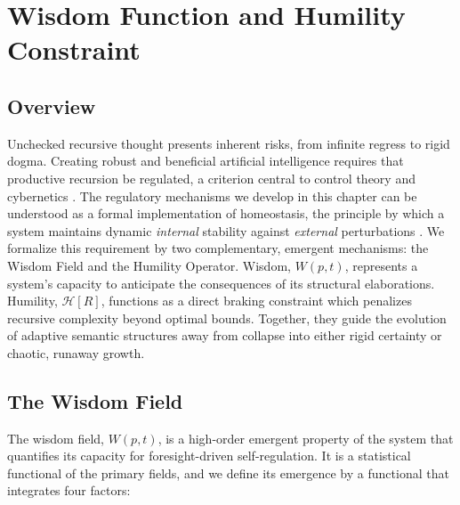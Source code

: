 \chapter{Wisdom Function and Humility Constraint}
\label{8:wisdom_function_and_humility_constraint}


\section{Overview}
\label{8.1:overview}

Unchecked recursive thought presents inherent risks, from infinite regress to rigid dogma. Creating robust and beneficial artificial intelligence requires that productive recursion be regulated, a criterion central to control theory and cybernetics \autocite{Kalman1960, AndersonMoore1990, Wiener1948, Ashby1952, RussellDeweyTegmark2016}. The regulatory mechanisms we develop in this chapter can be understood as a formal implementation of homeostasis, the principle by which a system maintains dynamic \textit{internal} stability against \textit{external} perturbations \autocite{Cannon1932}. We formalize this requirement by two complementary, emergent mechanisms: the Wisdom Field and the Humility Operator. Wisdom, \(W(p,t)\), represents a system's capacity to anticipate the consequences of its structural elaborations. Humility, \(\mathcal{H}[R]\), functions as a direct braking constraint which penalizes recursive complexity beyond optimal bounds. Together, they guide the evolution of adaptive semantic structures away from collapse into either rigid certainty or chaotic, runaway growth.


\section{The Wisdom Field}
\label{8.2:the_wisdom_field}

The wisdom field, \(W(p, t)\), is a high-order emergent property of the system that quantifies its capacity for foresight-driven self-regulation. It is a statistical functional of the primary fields, and we define its emergence by a functional that integrates four factors:

